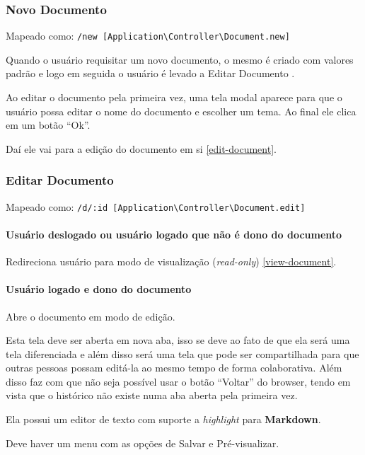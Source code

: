 \subsubsection{Novo Documento}

Mapeado como:
\texttt{/new {[}Application\textbackslash{}Controller\textbackslash{}Document.new{]}}

Quando o usuário requisitar um novo documento, o mesmo é criado com
valores padrão e logo em seguida o usuário é levado a Editar Documento
\label{edit-document}.

Ao editar o documento pela primeira vez, uma tela modal aparece para que
o usuário possa editar o nome do documento e escolher um tema. Ao final
ele clica em um botão ``Ok''.

Daí ele vai para a edição do documento em si \ref{edit-document}.

\subsubsection{Editar Documento \label{edit-document}}

Mapeado como:
\texttt{/d/:id {[}Application\textbackslash{}Controller\textbackslash{}Document.edit{]}}

\paragraph{Usuário deslogado ou usuário logado que não é dono do
documento}

Redireciona usuário para modo de visualização (\emph{read-only})
\ref{view-document}.

\paragraph{Usuário logado e dono do documento}

Abre o documento em modo de edição.

Esta tela deve ser aberta em nova aba, isso se deve ao fato de que ela
será uma tela diferenciada e além disso será uma tela que pode ser
compartilhada para que outras pessoas possam editá-la ao mesmo tempo de
forma colaborativa. Além disso faz com que não seja possível usar o
botão ``Voltar'' do browser, tendo em vista que o histórico não existe
numa aba aberta pela primeira vez.

Ela possui um editor de texto com suporte a \emph{highlight} para
\textbf{Markdown}.

Deve haver um menu com as opções de Salvar e Pré-visualizar.

